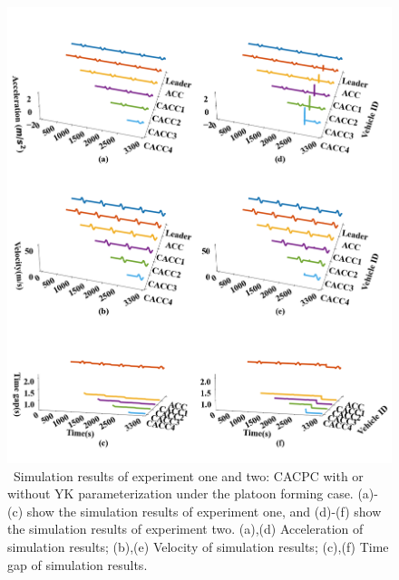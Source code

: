 \documentclass[trsc,nonblindrev]{informs3} %
\begin{document}
\begin{figure}
    \centering
    \includegraphics[width=14cm]{figs/c_form.png}
    \caption{~Simulation results of experiment one and two: CACPC with or without YK parameterization under the platoon forming case. (a)-(c) show the simulation results of experiment one, and (d)-(f) show the simulation results of experiment two. (a),(d) Acceleration of simulation results; (b),(e) Velocity of simulation results; (c),(f) Time gap of simulation results.}
    \label{new1}
\end{figure}
\end{document}

